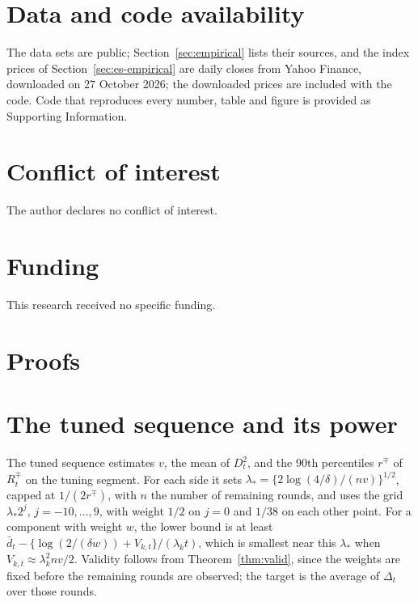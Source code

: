 \documentclass[11pt]{article}
\theoremstyle{remark}
\theoremstyle{definition}
\begin{document}
\section*{Data and code availability}
The data sets are public; Section~\ref{sec:empirical} lists their sources,
and the index prices of Section~\ref{sec:es-empirical} are daily closes from
Yahoo Finance, downloaded on 27 October 2026; the downloaded prices are
included with the code.
Code that reproduces every number, table and figure is provided as
Supporting Information.

\section*{Conflict of interest}
The author declares no conflict of interest.

\section*{Funding}
This research received no specific funding.

\appendix

\section{Proofs}
\label{app:proofs}



\section{The tuned sequence and its power}
\label{app:tuned}

The tuned sequence estimates $v$, the mean of $D_t^2$, and the 90th
percentiles $r^\mp$ of $R_t^\mp$ on the tuning segment. For each side it
sets $\lambda_*=\{2\log(4/\delta)/(nv)\}^{1/2}$, capped at $1/(2r^\mp)$,
with $n$ the number of remaining rounds, and uses the grid
$\lambda_*2^j$, $j=-10,\ldots,9$, with weight $1/2$ on $j=0$ and $1/38$ on
each other point. For a component with weight $w$, the lower bound is at
least $\bar d_t-\{\log(2/(\delta w))+V_{k,t}\}/(\lambda_kt)$, which is
smallest near this $\lambda_*$ when $V_{k,t}\approx\lambda_k^2nv/2$.
Validity follows from Theorem~\ref{thm:valid}, since the weights are fixed
before the remaining rounds are observed; the target is the average of
$\Delta_t$ over those rounds.
\end{document}

